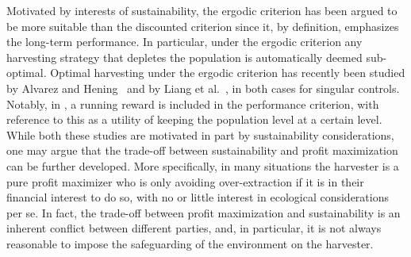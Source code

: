\documentclass[12pt]{article}
\begin{document}
Motivated by interests of sustainability, the ergodic criterion has been argued to be more suitable than the discounted criterion since it, by definition, emphasizes the long-term performance. In particular, under the ergodic criterion any harvesting strategy that depletes the population is automatically deemed sub-optimal.
Optimal harvesting under the ergodic criterion has recently been studied by Alvarez and Hening~\cite{AlvarezHening2022} and by Liang et al.~\cite{LiangLiuZervos2025}, in both cases for singular controls. Notably, in \cite{LiangLiuZervos2025}, a running reward is included in the performance criterion, with reference  
to this as a utility of keeping the population level at a certain level.
While both these studies are motivated in part by sustainability considerations, 
one may argue that the trade-off between sustainability and profit maximization can be further developed.
More specifically, in many situations the harvester 
is a pure profit maximizer who is only avoiding over-extraction if it is in their financial interest to do so,
with no or little interest in ecological considerations per se. In fact, the trade-off between profit maximization and sustainability is an inherent conflict between different parties, and, in particular, it is not always reasonable to impose the safeguarding of the environment on the harvester.
\end{document}
